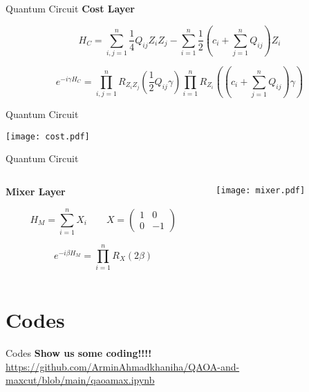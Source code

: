 \documentclass{beamer}
\begin{document}
\begin{frame}{Quantum Circuit}
   \textbf{Cost Layer}
   
    \[
H_C = \sum_{i,j=1}^n \frac{1}{4} Q_{ij} Z_i Z_j - \sum_{i=1}^n \frac{1}{2} \left( c_i + \sum_{j=1}^n Q_{ij} \right) Z_i
\]

\[
e^{-i \gamma H_C} = \prod_{i,j=1}^n R_{Z_i Z_j} \left( \frac{1}{2} Q_{ij} \gamma \right) \prod_{i=1}^n R_{Z_i} \left( \left( c_i + \sum_{j=1}^n Q_{ij} \right) \gamma \right)
\]

    

\end{frame}
\begin{frame}{Quantum Circuit}
    
 
    \texttt{[image: cost.pdf]}
 
 \end{frame}
\begin{frame}{Quantum Circuit}
    
    \begin{columns}
        
        \begin{column}{0.6\textwidth}
            \textbf{Mixer Layer}

            \[
H_M = \sum_{i=1}^n X_i \quad \quad X = \begin{pmatrix} 1 & 0 \\ 0 & -1 \end{pmatrix}
\]

\[
e^{-i \beta H_M} = \prod_{i=1}^n R_X(2 \beta)
\]
        \end{column}

        \begin{column}{0.40\textwidth}
            
         \texttt{[image: mixer.pdf]}
        \end{column}

        
    \end{columns}
    
 
     
 
 \end{frame}
\section{Codes}
                \begin{frame}{Codes}
                \textbf{Show us some coding!!!!}
                \url{https://github.com/ArminAhmadkhaniha/QAOA-and-maxcut/blob/main/qaoamax.ipynb}
                \end{frame}
                
\end{document}
